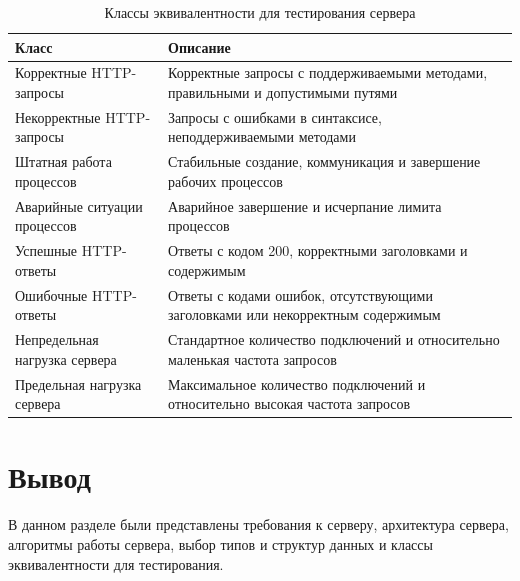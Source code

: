 \begin{table}[H]
	\centering
	\caption{Классы эквивалентности для тестирования сервера}
	\label{tab:equivalence_classes}
	\begin{tabularx}{\textwidth}{|p{4.5cm}|X|}
		\hline
		\textbf{Класс} & \textbf{Описание} \\
		\hline
		Корректные HTTP-запросы & Корректные запросы с поддерживаемыми методами, правильными и допустимыми путями \\
		\hline
		Некорректные HTTP-запросы & Запросы с ошибками в синтаксисе, неподдерживаемыми методами \\
		\hline
		Штатная работа процессов & Стабильные создание, коммуникация и завершение рабочих процессов \\
		\hline
		Аварийные ситуации процессов & Аварийное завершение и исчерпание лимита процессов \\
		\hline
		Успешные HTTP-ответы & Ответы с кодом 200, корректными заголовками и содержимым \\
		\hline
		Ошибочные HTTP-ответы & Ответы с кодами ошибок, отсутствующими заголовками или некорректным содержимым \\
		\hline
		Непредельная нагрузка сервера & Стандартное количество подключений и относительно маленькая частота запросов \\
		\hline
		Предельная нагрузка сервера & Максимальное количество подключений и относительно высокая частота запросов \\
		\hline
	\end{tabularx}
	
\end{table}

\section*{Вывод}

В данном разделе были представлены требования к серверу, архитектура сервера, алгоритмы работы сервера, выбор типов и структур данных и классы эквивалентности для тестирования.